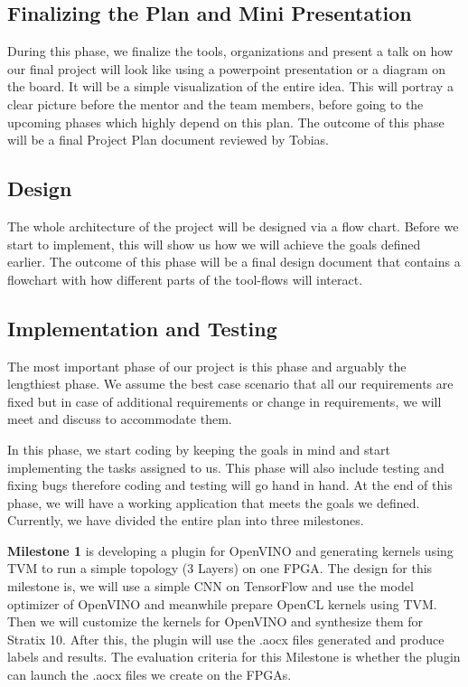 \documentclass[titlepage]{report}
\begin{document}
\subsection{Finalizing the Plan and Mini Presentation}
During this phase, we finalize the tools, organizations and present a talk on how our final project will look like using a powerpoint presentation or a diagram on the board. It will be a simple visualization of the entire idea. This will portray a clear picture before the mentor and the team members, before going to the upcoming phases which highly depend on this plan. The outcome of this phase will be a final Project Plan document reviewed by Tobias. 

\subsection{Design}
The whole architecture of the project will be designed via a flow chart. Before we start to implement, this will show us how we will achieve the goals defined earlier. The outcome of this phase will be a final design document that contains a flowchart with how different parts of the tool-flows will interact. 

\subsection{Implementation and Testing}
The most important phase of our project is this phase and arguably the lengthiest phase. We assume the best case scenario that all our requirements are fixed but in case of additional requirements or change in requirements, we will meet and discuss to accommodate them. 

In this phase, we start coding by keeping the goals in mind and start implementing the tasks assigned to us. This phase will also include testing and fixing bugs therefore coding and testing will go hand in hand. At the end of this phase, we will have a working application that meets the goals we defined.
Currently, we have divided the entire plan into three milestones.

\textbf{Milestone 1} is developing a plugin for OpenVINO and generating kernels using TVM to run a simple topology (3 Layers) on one FPGA. The design for this milestone is, we will use a simple CNN on TensorFlow and use the model optimizer of OpenVINO and meanwhile prepare OpenCL kernels using TVM. Then we will customize the kernels for OpenVINO and synthesize them for Stratix 10. After this, the plugin will use the .aocx files generated and produce labels and results.  The evaluation criteria for this Milestone is whether the plugin can launch the .aocx files we create on the FPGAs.
\end{document}
